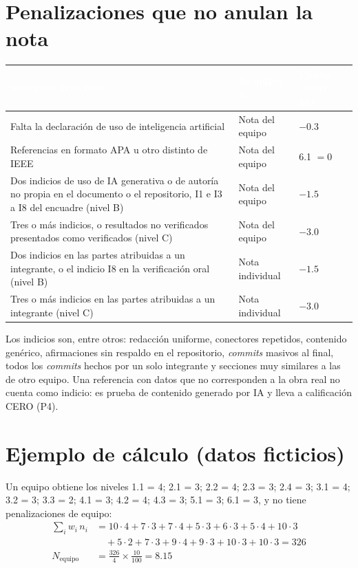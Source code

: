 \documentclass[11pt,a4paper]{article}
\newcommand{\hdr}[1]{\textcolor{white}{\textbf{#1}}}
\begin{document}
\section{Penalizaciones que no anulan la nota}\label{sec:penalizaciones}

\begin{xltabular}{\linewidth}{@{}YL{2.8cm}C{2.0cm}@{}}
	\toprule
	\hdr{Situación detectada} & \hdr{Se aplica a} & \hdr{Efecto (sobre 10)} \\
	\midrule
	\endhead
	Falta la declaración de uso de inteligencia artificial & Nota del equipo & $-0.3$ \\
	Referencias en formato APA u otro distinto de IEEE & Nota del equipo & 6.1 $=0$ \\
	Dos indicios de uso de IA generativa o de autoría no propia en el documento o el repositorio, I1 e I3 a I8 del encuadre (nivel B) & Nota del equipo & $-1.5$ \\
	Tres o más indicios, o resultados no verificados presentados como verificados (nivel C) & Nota del equipo & $-3.0$ \\
	Dos indicios en las partes atribuidas a un integrante, o el indicio I8 en la verificación oral (nivel B) & Nota individual & $-1.5$ \\
	Tres o más indicios en las partes atribuidas a un integrante (nivel C) & Nota individual & $-3.0$ \\
	\bottomrule
\end{xltabular}

Los indicios son, entre otros: redacción uniforme, conectores repetidos, contenido genérico, afirmaciones sin respaldo en el repositorio, \emph{commits} masivos al final, todos los \emph{commits} hechos por un solo integrante y secciones muy similares a las de otro equipo. Una referencia con datos que no corresponden a la obra real no cuenta como indicio: es prueba de contenido generado por IA y lleva a calificación CERO (P4).

\section{Ejemplo de cálculo (datos ficticios)}

Un equipo obtiene los niveles 1.1 = 4; 2.1 = 3; 2.2 = 4; 2.3 = 3; 2.4 = 3; 3.1 = 4; 3.2 = 3; 3.3 = 2; 4.1 = 3; 4.2 = 4; 4.3 = 3; 5.1 = 3; 6.1 = 3, y no tiene penalizaciones de equipo:
\begin{align*}
	\sum_i w_i\,n_i &= 10\cdot4 + 7\cdot3 + 7\cdot4 + 5\cdot3 + 6\cdot3 + 5\cdot4 + 10\cdot3 \\
	&\quad + 5\cdot2 + 7\cdot3 + 9\cdot4 + 9\cdot3 + 10\cdot3 + 10\cdot3 = 326 \\
	N_{\text{equipo}} &= \frac{326}{4}\times\frac{10}{100} = 8.15
\end{align*}
\end{document}
